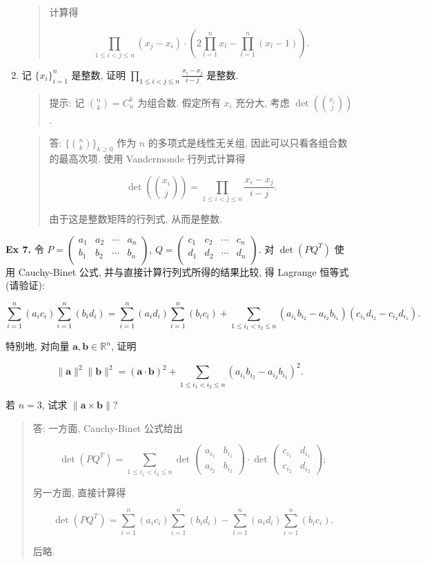 \documentclass[
]{ctexart}
\begin{document}
\begin{enumerate}
\begin{quote}
  计算得

  \[\prod_{1\leq i<j\leq n}(x_j-x_i)\cdot \left(2\prod_{l=1}^nx_l-\prod_{l=1}^n (x_l-1)\right).\]
  \end{quote}
\item
  记 \(\{x_i\}_{i=1}^n\) 是整数, 证明
  \(\prod_{1\leq i<j\leq n}\frac{x_i-x_j}{i-j}\) 是整数.

  \begin{quote}
  提示: 记 \(\binom{n}{k}=C_n^k\) 为组合数. 假定所有 \(x_i\) 充分大,
  考虑 \(\det(\binom{x_i}{j})\).
  \end{quote}

  \begin{quote}
  答: \(\{\binom{n}{k}\}_{k\geq 0}\) 作为 \(n\) 的多项式是线性无关组,
  因此可以只看各组合数的最高次项. 使用 Vandermonde 行列式计算得

  \[\det\left (\binom{x_i}{j}\right ) = \prod_{1\leq i<j\leq n}\frac{x_i-x_j}{i-j}.\]

  由于这是整数矩阵的行列式, 从而是整数.
  \end{quote}
\end{enumerate}

\textbf{Ex 7.} 令
\(P=\left(\begin{array}{cccc}a_1&a_2&\cdots& a_n\\b_1&b_2&\cdots& b_n\\\end{array}\right)\),
\(Q=\left(\begin{array}{cccc}c_1&c_2&\cdots& c_n\\d_1&d_2&\cdots& d_n\\\end{array}\right)\).
对 \(\det (PQ^T)\) 使用 Cauchy-Binet 公式,
并与直接计算行列式所得的结果比较, 得 Lagrange 恒等式 (请验证):

\[\sum_{i=1}^n(a_ic_i)\sum_{i=1}^n(b_id_i)=\sum_{i=1}^n(a_id_i)\sum_{i=1}^n(b_ic_i)+\sum_{1\leq i_1<i_2\leq n}(a_{i_1}b_{i_2}-a_{i_2}b_{i_1})(c_{i_1}d_{i_2}-c_{i_2}d_{i_1}).\]

特别地, 对向量 \(\mathbf a, \mathbf b\in \mathbb R^n\), 证明

\[\|\mathbf a\|^2\|\mathbf b\|^2=(\mathbf a\cdot\mathbf b)^2+\sum_{1\leq i_1<i_2\leq n}(a_{i_1}b_{i_2}-a_{i_2}b_{i_1})^2.\]

若 \(n=3\), 试求 \(\|\mathbf a\times \mathbf b\|\)?

\begin{quote}
答: 一方面, Cauchy-Binet 公式给出

\[\det (PQ^T)=\sum_{1\leq i_1<i_2\leq n}\det\begin{pmatrix}a_{i_1}&b_{i_1}\\a_{i_2}&b_{i_2}\end{pmatrix}\cdot \det\begin{pmatrix}c_{i_1}&d_{i_1}\\c_{i_2}&d_{i_2}\end{pmatrix};\]

另一方面, 直接计算得

\[\det (PQ^T)=\sum_{i=1}^n(a_ic_i)\sum_{i=1}^n(b_id_i)-\sum_{i=1}^n(a_id_i)\sum_{i=1}^n(b_ic_i).\]

后略.
\end{quote}
\end{document}

